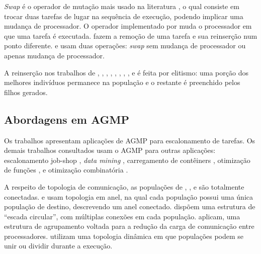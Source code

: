\documentclass[fleqn,10pt]{SelfArx} %
\begin{document}
\textit{Swap} é o operador de mutação mais usado na literatura \cite{Hou1994,WANG19978,Kwok:1999:SSA:344588.344618,HWANG2008976,CHITRA20112725,XU2014255},
o qual consiste em trocar duas tarefas de lugar na sequência de execução, podendo implicar uma mudança de processador. O operador implementado por \citeauthor{OMARA201013} muda o processador em que uma tarefa é executada. \citeauthor{Correa} fazem a remoção de uma tarefa e sua reinserção num ponto diferente. \citeauthor{Kaur_heuristicsbased} e \citeauthor{Morady} usam duas operações: \textit{swap} sem mudança de processador ou apenas mudança de processador.

A reinserção nos trabalhos de \citeauthor{Hou1994}, \citeauthor{WANG19978}, \citeauthor{Kwok:1997:ESA:274066.274077}, \citeauthor{Correa}, \citeauthor{HWANG2008976}, \citeauthor{Kaur_heuristicsbased}, \citeauthor{CHITRA20112725}, \citeauthor{XU2014255}, e \citeauthor{Morady} é feita por elitismo: uma porção dos melhores indivíduos permanece na população e o restante é preenchido pelos filhos gerados.


\subsection{Abordagens em AGMP}
Os trabalhos \cite{Kwok:1997:ESA:274066.274077,Morady} apresentam aplicações de AGMP para escalonamento de tarefas. Os demais trabalhos consultados usam o AGMP para outras aplicações: escalonamento job-shop \cite{Qi2000}, \textit{data mining} \cite{Srinivasa:2007:SMM:1279013.1279229}, carregamento de contêiners \cite{Gehring}, otimização de funções \cite{Muhlenbein:1991:PPG:1746086.1746158,Yao}, e otimização combinatória \cite{Han}.

A respeito de topologia de comunicação, as populações de \citeauthor{Kwok:1997:ESA:274066.274077}, \citeauthor{Qi2000}, e \citeauthor{Srinivasa:2007:SMM:1279013.1279229} são totalmente conectadas. \citeauthor{Gehring} e \citeauthor{Morady} usam topologia em anel, na qual cada população possui uma única população de destino, descrevendo um anel conectado. \citeauthor{Muhlenbein:1991:PPG:1746086.1746158} dispõem uma estrutura de ``escada circular'', com múltiplas conexões em cada população. \citeauthor{Han} aplicam, uma estrutura de agrupamento voltada para a redução da carga de comunicação entre processadores. \citeauthor{Yao} utilizam uma topologia dinâmica em que populações podem se unir ou dividir durante a execução.
\end{document}
